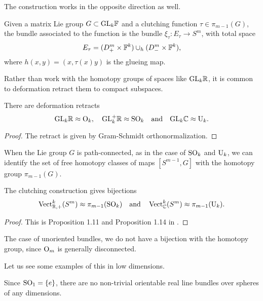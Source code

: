 The construction works in the opposite direction as well.

\begin{definition}
	Given a matrix Lie group $G\subset \mathrm{GL}_k\mathbb{F}$ and a clutching function $\tau\in \pi_{m-1}(G)$, the bundle associated to the function is the bundle $\xi_\tau : E_\tau \to S^{m}$, with total space
	\[
		E_\tau = (D_+^m\times \mathbb{F}^k)\cup_h (D_-^{m}\times \mathbb{F}^k),
	\]
	where $h(x,y)=(x,\tau(x)y)$ is the glueing map.
\end{definition}

Rather than work with the homotopy groups of spaces like $\mathrm{GL}_k\mathbb{R}$, it is common to deformation retract them to compact subspaces.

\begin{proposition}
	There are deformation retracts
	\[
		\mathrm{GL}_k\mathbb{R} \approx \mathrm{O}_k,\quad \mathrm{GL}_k^+\mathbb{R} \approx \mathrm{SO}_k\quad\textrm{and}\quad \mathrm{GL}_k\mathbb{C} \approx \mathrm{U}_k.
	\]
\end{proposition}
\begin{proof}
	The retract is given by Gram-Schmidt orthonormalization.
\end{proof}

When the Lie group $G$ is path-connected, as in the case of $\mathrm{SO}_k$ and $\mathrm{U}_k$, we can identify the set of free homotopy classes of maps $[S^{m-1}, G]$ with the homotopy group $\pi_{m-1}(G)$.

\begin{theorem}
	The clutching construction gives bijections
	\[
			\operatorname{Vect}_{\mathbb{R},+}^k(S^m) \approx \pi_{m-1}(\mathrm{SO}_k)\quad\textrm{and}\quad
			\operatorname{Vect}_{\mathbb{C}}^k(S^m) \approx \pi_{m-1}(\mathrm{U}_k).
	\]
\end{theorem}
\begin{proof}
	This is Proposition 1.11 and Proposition 1.14 in \cite{hatcher2003ktheory}.
\end{proof}

\begin{remark} 
	The case of unoriented bundles, we do not have a bijection with the homotopy group, since $\mathrm{O}_m$ is generally disconnected.
\end{remark}

Let us see some examples of this in low dimensions.

\begin{example}
	Since $\mathrm{SO}_1 = \{e\}$, there are no non-trivial orientable real line bundles over spheres of any dimensions.
\end{example}

